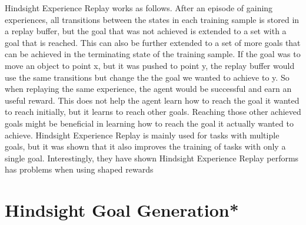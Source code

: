 \vspace{0.5cm}

Hindsight Experience Replay works as follows. After an episode of gaining experiences, all transitions between the states in each training sample is stored in a replay buffer, but the goal that was not achieved is extended to a set with a goal that is reached. This can also be further extended to a set of more goals that can be achieved in the terminating state of the training sample. If the goal was to move an object to point x, but it was pushed to point y, the replay buffer would use the same transitions but change the the goal we wanted to achieve to y. So when replaying the same experience, the agent would be successful and earn an useful reward. This does not help the agent learn how to reach the goal it wanted to reach initially, but it learns to reach other goals. Reaching those other achieved goals might be beneficial in learning how to reach the goal it actually wanted to achieve. Hindsight Experience Replay is mainly used for tasks with multiple goals, but it was shown that it also improves the training of tasks with only a single goal. 
Interestingly, they have shown Hindsight Experience Replay performs has problems when using shaped rewards
 



\section{Hindsight Goal Generation*}


